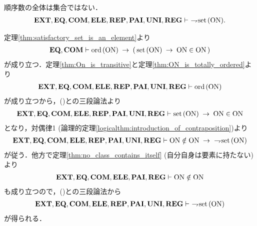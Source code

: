 	\begin{screen}
		\begin{thm}\label{thm:Burali_Forti}
			順序数の全体は集合ではない．
			\begin{align}
				\mbox{{\bf EXT}},\mbox{{\bf EQ}},\mbox{\bf COM},\mbox{{\bf ELE}},\mbox{{\bf REP}},\mbox{{\bf PAI}},\mbox{{\bf UNI}},\mbox{{\bf REG}}
				\vdash\ \rightharpoondown\hspace{-0.25em} \operatorname*{set}\hspace{0.15em}(\mathrm{ON}).
			\end{align}
		\end{thm}
	\end{screen}
	
	\begin{prf}
		定理\ref{thm:satisfactory_set_is_an_element}より
		\begin{align}
			\EQAX,\COMAX \vdash \ord{\ON} \rarrow (\, \set{\ON} \rarrow \ON \in \ON\, )
			\label{eq:Burali_Forti_1}
		\end{align}
		が成り立つ．定理\ref{thm:On_is_transitive}と定理\ref{thm:ON_is_totally_ordered}より
		\begin{align}
			\mbox{{\bf EXT}},\mbox{{\bf EQ}},\mbox{\bf COM},\mbox{{\bf ELE}},\mbox{{\bf REP}},\mbox{{\bf PAI}},\mbox{{\bf UNI}},\mbox{{\bf REG}}
			\vdash \operatorname*{ord}\hspace{0.15em}(\mathrm{ON})
		\end{align}
		が成り立つから，()との三段論法より
		\begin{align}
			\mbox{{\bf EXT}},\mbox{{\bf EQ}},\mbox{\bf COM},\mbox{{\bf ELE}},\mbox{{\bf REP}},\mbox{{\bf PAI}},\mbox{{\bf UNI}},\mbox{{\bf REG}}
			\vdash \operatorname*{set}\hspace{0.15em}(\mathrm{ON}) \hspace{0.25em}\rightarrow\hspace{0.25em} \mathrm{ON} \in \mathrm{ON}
		\end{align}
		となり，対偶律1 (論理的定理\ref{logicalthm:introduction_of_contraposition})より
		\begin{align}
			\EXTAX,\EQAX,\COMAX,\ELEAX,\REPAX,\PAIAX,\UNIAX,\REGAX
			\vdash \ON \notin \ON \rarrow\ \negation \set{\ON}
			\label{eq:Burali_Forti_2}
		\end{align}
		が従う．他方で定理\ref{thm:no_class_contains_itself} (自分自身は要素に持たない)より
		\begin{align}
			\mbox{{\bf EXT}},\mbox{{\bf EQ}},\mbox{\bf COM},\mbox{{\bf ELE}},\mbox{{\bf PAI}},\mbox{{\bf REG}} \vdash \mathrm{ON} \notin \mathrm{ON}
		\end{align}
		も成り立つので，()との三段論法から
		\begin{align}
			\mbox{{\bf EXT}},\mbox{{\bf EQ}},\mbox{\bf COM},\mbox{{\bf ELE}},\mbox{{\bf REP}},\mbox{{\bf PAI}},\mbox{{\bf UNI}},\mbox{{\bf REG}}
			\vdash\ \rightharpoondown\hspace{-0.25em} \operatorname*{set}\hspace{0.15em}(\mathrm{ON})
		\end{align}
		が得られる．
		\QED
	\end{prf}